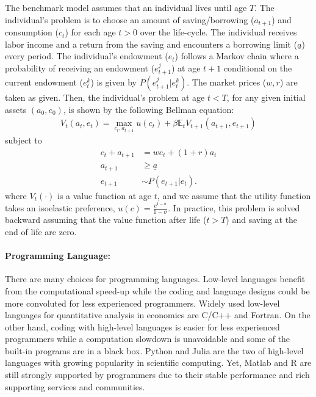 \documentclass[12pt]{article}
\begin{document}
The benchmark model assumes that an individual lives until age $T$. The individual's problem is to choose an amount of saving/borrowing ($a_{t+1}$) and consumption ($c_t$) for each age $t>0$ over the life-cycle. The individual receives labor income and a return from the saving and encounters a borrowing limit ($\underline{a}$) every period. The individual's endowment ($e_t$) follows a Markov chain where a probability of receiving an endowment ($e^j_{t+1}$) at age $t+1$ conditional on the current endowment ($e^k_t$) is given by $P(e^j_{t+1}|e^k_{t})$. The market prices ($w,r$) are taken as given. Then, the individual's problem at age $t<T$, for any given initial assets $(a_0,e_0)$, is shown by the following Bellman equation:
\begin{align*}
V_t(a_{t},e_t) = \max_{c_t,a_{t+1}} u(c_{t}) + \beta \mathbb{E}_t V_{t+1}(a_{t+1},e_{t+1})
\end{align*}
subject to
\begin{align*}
c_t + a_{t+1} 	&= w e_t + (1+r)a_t \\
a_{t+1} 		&\geq \underline{a}\\
e_{t+1} 		&\sim P(e_{t+1}|e_t).
\end{align*}
where $V_t(\cdot)$ is a value function at age $t$, and we assume that the utility function takes an isoelastic preference, $u(c) = \frac{c^{1-\sigma}}{1-\sigma}$. In practice, this problem is solved backward assuming that the value function after life ($t>T$) and saving at the end of life are zero.



\paragraph{Programming Language:} There are many choices for programming languages. Low-level languages benefit from the computational speed-up while the coding and language designs could be more convoluted for less experienced programmers. Widely used low-level languages for quantitative analysis in economics are C/C++ and Fortran. On the other hand, coding with high-level languages is easier for less experienced programmers while a computation slowdown is unavoidable and some of the built-in programs are in a black box. Python and Julia are the two of high-level languages with growing popularity in scientific computing. Yet, Matlab and R are still strongly supported by programmers due to their stable performance and rich supporting services and communities. 
\end{document}
